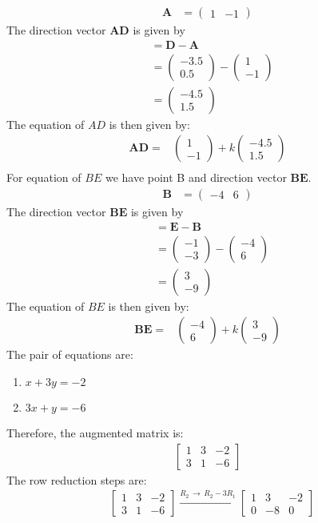 \documentclass[journal,12pt,twocolumn]{IEEEtran}
\theoremstyle{remark}
\newcommand{\myvec}[1]{\begin{pmatrix}#1\end{pmatrix}}
\let\vec\mathbf
\begin{document}
\begin{align*}
    \vec{A} &= \myvec{1 & -1}    
\end{align*}
The direction vector $\vec{AD}$ is given by
\begin{align*}
&= \vec{D} - \vec{A} \\
&= \myvec{-3.5 \\ 0.5} - \myvec{1 \\ -1} \\
&= \myvec{-4.5 \\ 1.5}
\end{align*}
The equation of $AD$ is then given by:
\begin{align*}
\text{} \vec{AD} = &\myvec{1\\-1} + k \myvec{-4.5\\1.5}\\
\end{align*}
For equation of $BE$ we have point B and direction vector $\vec{BE}$.\begin{align*}
    \vec{B} &= \myvec{-4 & 6}    
\end{align*}
The direction vector $\vec{BE}$ is given by
\begin{align*}
&= \vec{E} - \vec{B} \\
&= \myvec{-1 \\ -3} - \myvec{-4 \\ 6} \\
&= \myvec{3 \\ -9}
\end{align*}The equation of $BE$ is then given by:
\begin{align*}
\text{} \vec{BE} = &\myvec{-4\\6} + k \myvec{3\\-9}
\end{align*}
The pair of equations are:
\begin{enumerate}
  \item $x + 3y = -2$
  \item $3x + y = -6$\\
\end{enumerate}
Therefore, the augmented matrix is:
\begin{align*}
\begin{bmatrix}
1 & 3 & -2 \\
3 & 1 & -6
\end{bmatrix}
\end{align*}
The row reduction steps are:\\ 
\begin{align*}
&\begin{bmatrix}
1 & 3 & -2 \\
3 & 1 & -6
\end{bmatrix}
\xrightarrow{R_{2}\,\xrightarrow{}\,R_{2}-3R_{1}}
\begin{bmatrix}
1 & 3 & -2 \\
0 & -8 & 0
\end{bmatrix}
\end{align*}
\end{document}
